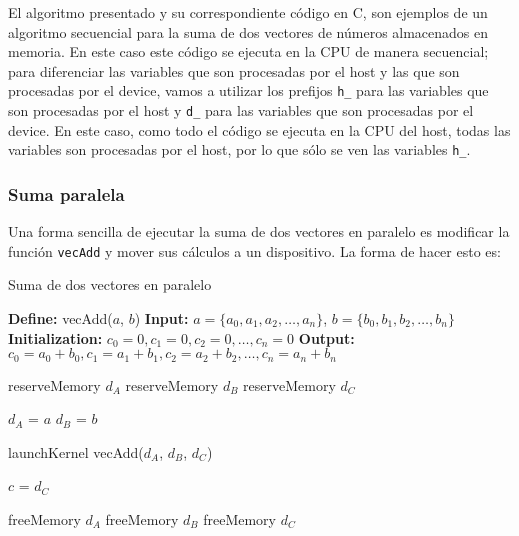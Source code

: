 El algoritmo presentado y su correspondiente código en C, son ejemplos de un algoritmo secuencial para la suma de dos
vectores de números almacenados en memoria. En este caso este código se ejecuta en la CPU de manera secuencial; para
diferenciar las variables que son procesadas por el host y las que son procesadas por el device, vamos a utilizar los
prefijos \texttt{h\_} para las variables que son procesadas por el host y \texttt{d\_} para las variables que son
procesadas por el device. En este caso, como todo el código se ejecuta en la CPU del host, todas las variables son
procesadas por el host, por lo que sólo se ven las variables \texttt{h\_}.

\subsubsection{Suma paralela}

Una forma sencilla de ejecutar la suma de dos vectores en paralelo es modificar la función \texttt{vecAdd} y mover sus
cálculos a un dispositivo. La forma de hacer esto es:

\begin{algorithm}
\caption{Suma de dos vectores en paralelo}
  \begin{algorithmic}[1]
  \Statex \textbf{Define:} vecAdd($a$, $b$)
  \Statex \textbf{Input:} $a = \{a_0, a_1, a_2, \ldots, a_n\}$, $b = \{b_0, b_1, b_2, \ldots, b_n\}$
  \Statex \textbf{Initialization:} $c_0 = 0, c_1 = 0, c_2 = 0, \ldots, c_n = 0$
  \Statex \textbf{Output:} $c_0 = a_0 + b_0, c_1 = a_1 + b_1, c_2 = a_2 + b_2, \ldots, c_n = a_n + b_n$

  \Statex reserveMemory $d_A$
  \Statex reserveMemory $d_B$
  \Statex reserveMemory $d_C$

  \Statex $d_A$ = $a$
  \Statex $d_B$ = $b$

  \Statex launchKernel vecAdd($d_A$, $d_B$, $d_C$)

  \Statex $c$ = $d_C$

  \Statex freeMemory $d_A$
  \Statex freeMemory $d_B$
  \Statex freeMemory $d_C$
\end{algorithmic}
\end{algorithm}

